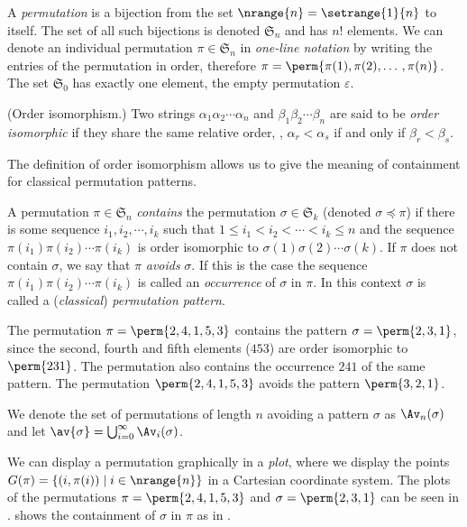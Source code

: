 A \emph{permutation} is a bijection from the set \(\nrange{n} = \setrange{1}{n}\) to itself. The
set of all such bijections is denoted \(\mathfrak{S}_n\) and has \(n!\) elements. We can
denote an individual permutation \(\pi\in\mathfrak{S}_n\) in \emph{one-line notation} by writing the
entries of the permutation in order, therefore \(\pi = \perm{\pi(1),\pi(2),\dotso,\pi(n)}\). The
set \(\mathfrak{S}_0\) has exactly one element, the empty permutation \(\varepsilon\).

\begin{definition}{(Order isomorphism.)}
    Two strings \(\alpha_1\alpha_2\dotsm\alpha_n\) and
    \(\beta_1\beta_2\dotsm\beta_n\) are said to be \emph{order isomorphic}
    if they share the same relative order, \ie, \(\alpha_r<\alpha_s\) if and
    only if \(\beta_r<\beta_s\).
\end{definition}

The definition of order isomorphism allows us to give the meaning of containment for classical
permutation patterns.
\begin{definition}
    A permutation \(\pi\in\mathfrak{S}_n\) \emph{contains} the permutation \(\sigma\in\mathfrak{S}_k\) (\mbox{denoted}
    \(\sigma \preceq \pi\)) if there is some sequence \( i_1,i_2,\dotsm{},i_k\)
    such that \(1\le i_1<i_2<\dotsm<i_k\le n\) and the sequence \(\pi(i_1)\pi(i_2)\dotsm\pi(i_k)\) is order isomorphic to
    \(\sigma(1)\sigma(2)\dotsm\sigma(k)\). If \(\pi\) does not contain \(\sigma\), we say that
    \(\pi\) \emph{avoids} \(\sigma\). If this is the case the sequence
    \(\pi(i_1)\pi(i_2)\dotsm\pi(i_k)\) is called an \emph{occurrence} of \(\sigma\)
    in \(\pi\). In this context \(\sigma\) is called a (\emph{classical})
    \emph{permutation pattern}.
\end{definition}

\begin{example}
\label{ex:contexmpl}
The permutation \(\pi = \perm{2,4,1,5,3}\) contains the pattern
\(\sigma = \perm{2,3,1}\), since the second, fourth and fifth elements (\(453\)) are order
isomorphic to \(\perm{231}\). The permutation also contains the occurrence \(241\) of the same pattern. The permutation
\(\perm{2,4,1,5,3}\) avoids the pattern \(\perm{3,2,1}\).
\end{example}

We denote the set of permutations of length \(n\) avoiding a pattern \(\sigma\) as \(\Av_n(\sigma)\)
and let \(\av{\sigma}=\bigcup_{i=0}^{\infty}\Av_i(\sigma)\).

We can display a permutation graphically in a \emph{plot}, where we display the points
\(G(\pi) = \{(i,\pi(i))\mid i \in \nrange{n} \}\) in a Cartesian coordinate system. The plots of the permutations \(\pi =
\perm{2,4,1,5,3}\) and \(\sigma = \perm{2,3,1}\) can be seen in .
 shows the containment of \(\sigma\) in \(\pi\) as in .


